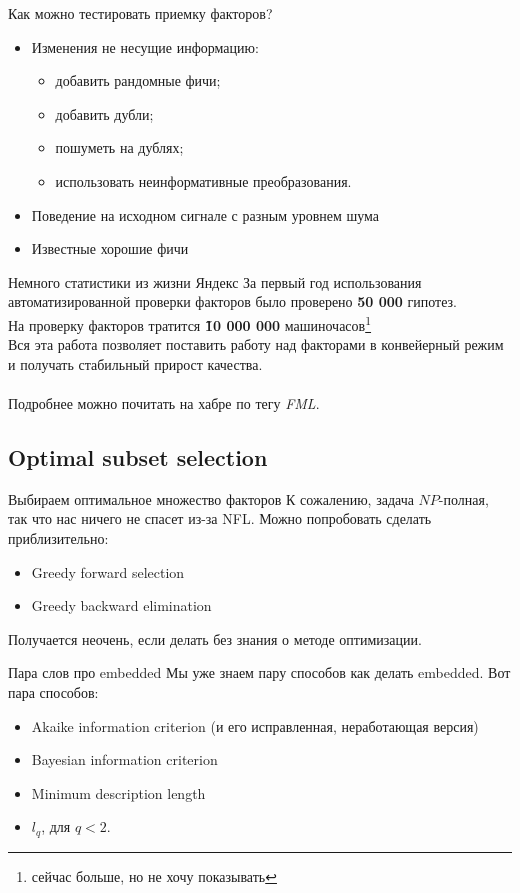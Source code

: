 \documentclass[14pt, fleqn, xcolor={dvipsnames, table}]{beamer}
\begin{document}
\begin{frame}{Как можно тестировать приемку факторов?}
\begin{itemize}
  \item Изменения не несущие информацию:
  \begin{itemize}
    \item добавить рандомные фичи;
    \item добавить дубли;
    \item пошуметь на дублях;
    \item использовать неинформативные преобразования.
  \end{itemize}
  \item Поведение на исходном сигнале с разным уровнем шума
  \item Известные хорошие фичи
\end{itemize}
\end{frame}

\begin{frame}{Немного статистики из жизни {\color{red}Я}ндекс}
За первый год использования автоматизированной проверки факторов было проверено \textbf{50 000} гипотез. \\
На проверку факторов тратится \textbf{\~10 000 000} машиночасов\footnote{сейчас больше, но не хочу показывать} \\
Вся эта работа позволяет поставить работу над факторами в конвейерный режим и получать стабильный прирост качества. \\
~\\
Подробнее можно почитать на хабре по тегу \textit{FML}.
\end{frame}

\subsection{Optimal subset selection}
\begin{frame}{Выбираем оптимальное множество факторов}
К сожалению, задача $NP$-полная, так что нас ничего не спасет из-за NFL. Можно попробовать сделать приблизительно:
\begin{itemize}
  \item Greedy forward selection
  \item Greedy backward elimination
\end{itemize}
Получается неочень, если делать без знания о методе оптимизации.
\end{frame}

\begin{frame}{Пара слов про embedded}
Мы уже знаем пару способов как делать embedded. Вот пара способов:
\begin{itemize}
  \item Akaike information criterion (и его исправленная, неработающая версия)
  \item Bayesian information criterion
  \item Minimum description length
  \item $l_q$, для $q < 2$.
\end{itemize}
\end{frame}
\end{document}
